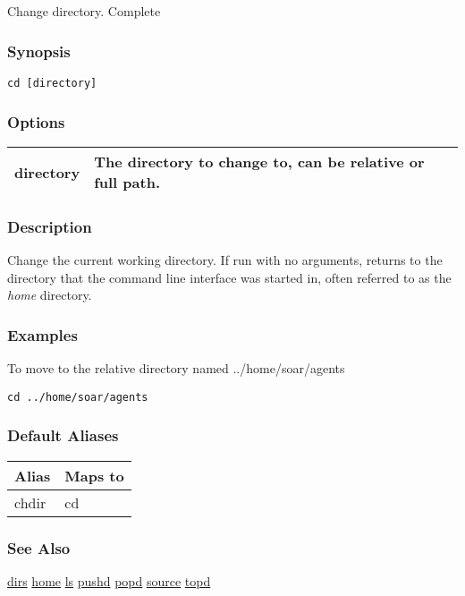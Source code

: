 \subsection{}
\label{cd}
Change directory. 
 Complete
\subsubsection*{Synopsis}
\begin{verbatim}
cd [directory]
\end{verbatim}
\subsubsection*{Options}
\begin{tabular}{|l|l|}
\hline 
 directory  & The directory to change to, can be relative or full path.  \\
 \hline 
\end{tabular}
\subsubsection*{Description}
 Change the current working directory. If run with no arguments, returns to the directory that the command line interface was started in, often referred to as the \emph{home}
 directory. 
\subsubsection*{Examples}
 To move to the relative directory named ../home/soar/agents \begin{verbatim}
cd ../home/soar/agents
\end{verbatim}
\subsubsection*{Default Aliases}
\begin{tabular}{|l|l|}
\hline 
 Alias  & Maps to  \\
 \hline 
 chdir  & cd  \\
 \hline 
\end{tabular}
\subsubsection*{See Also}
\hyperref[dirs]{dirs} \hyperref[home]{home} \hyperref[ls]{ls} \hyperref[pushd]{pushd} \hyperref[popd]{popd} \hyperref[source]{source} \hyperref[topd]{topd} 